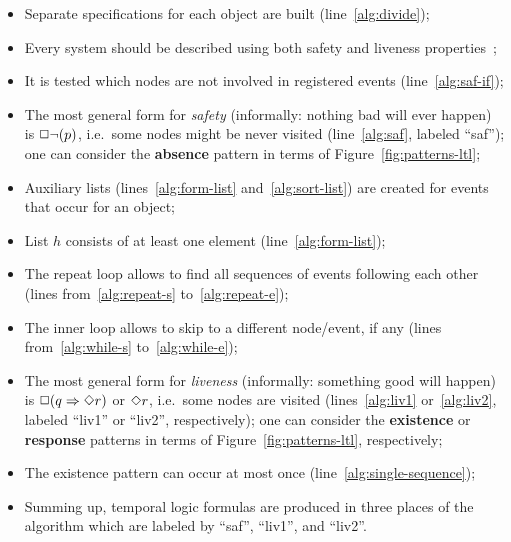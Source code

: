 \documentclass[runningheads,a4paper]{llncs}
\begin{document}
\begin{itemize}
  \item Separate specifications for each object are built (line~\ref{alg:divide});
  \item Every system should be described using both safety and liveness properties~\cite{Alpern-Schneider-1985};
  \item It is tested which nodes are not involved in registered events (line~\ref{alg:saf-if});
  \item The most general form for \emph{safety} (informally: nothing bad will ever happen) is $\Box\neg(p)$,
        i.e.\ some nodes might be never visited (line~\ref{alg:saf}, labeled ``saf'');
        one can consider the \textbf{absence} pattern in terms of Figure~\ref{fig:patterns-ltl};
  \item Auxiliary lists (lines~\ref{alg:form-list} and~\ref{alg:sort-list})
        are created for events that occur for an object;
  \item List $h$ consists of at least one element (line~\ref{alg:form-list});
  \item The repeat loop allows to find all sequences of events following each other
       (lines from~\ref{alg:repeat-s} to~\ref{alg:repeat-e});
  \item The inner loop allows to skip to a different node/event, if any
       (lines from~\ref{alg:while-s} to~\ref{alg:while-e});
  \item The most general form for \emph{liveness} (informally: something good will happen) is $\Box(q \Rightarrow \Diamond r)$ or $\Diamond r$,
        i.e.\ some nodes are visited (lines~\ref{alg:liv1} or~\ref{alg:liv2}, labeled ``liv1'' or ``liv2'', respectively);
        one can consider the \textbf{existence} or \textbf{response} patterns in terms of Figure~\ref{fig:patterns-ltl}, respectively;
  \item The existence pattern can occur at most once (line~\ref{alg:single-sequence});
  \item Summing up, temporal logic formulas are produced in three places of the algorithm which are labeled by ``saf'', ``liv1'', and ``liv2''.
\end{itemize}
\end{document}
